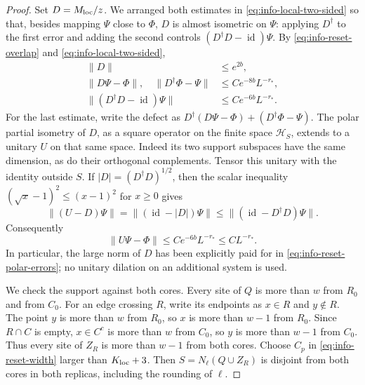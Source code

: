 \documentclass[11pt]{article}
\numberwithin{equation}{section}
\theoremstyle{definition}
\theoremstyle{remark}
\DeclareMathOperator{\id}{id}
\newcommand{\norm}[1]{\lVert #1\rVert}
\begin{document}
\begin{proof}
Set $D=M_{\rm loc}/z$.  We arranged both estimates in
\eqref{eq:info-local-two-sided} so that, besides mapping $\Psi$ close
to $\Phi$, $D$ is almost isometric on $\Psi$: applying $D^\dagger$
to the first error and adding the second controls
$(D^\dagger D-\id)\Psi$.  By
\eqref{eq:info-reset-overlap} and \eqref{eq:info-local-two-sided},
\begin{align}
 \norm D&\le e^{2b},\\
 \norm{D\Psi-\Phi},\quad\norm{D^\dagger\Phi-\Psi}
      &\le C e^{-8b}L^{-r_*},\\
 \norm{(D^\dagger D-\id)\Psi}
      &\le C e^{-6b}L^{-r_*}.
 \label{eq:info-reset-polar-errors}
\end{align}
For the last estimate, write the defect as
$D^\dagger(D\Psi-\Phi)+(D^\dagger\Phi-\Psi)$.
The polar partial isometry of $D$, as a square operator on the finite
space $\mathcal H_S$, extends to a unitary $U$ on that same space.
Indeed its two support subspaces have the same dimension, as do their
orthogonal complements.  Tensor this unitary with the identity outside
$S$.  If $|D|=(D^\dagger D)^{1/2}$, then the scalar inequality
$(\sqrt{x}-1)^2\le(x-1)^2$ for $x\ge0$ gives
\[
 \norm{(U-D)\Psi}=\norm{(\id-|D|)\Psi}
       \le\norm{(\id-D^\dagger D)\Psi}.
\]
Consequently
\begin{equation}
 \norm{U\Psi-\Phi}\le C e^{-6b}L^{-r_*}\le CL^{-r_*}.
 \label{eq:info-reset-unitary}
\end{equation}
In particular, the large norm of $D$ has been explicitly paid for in
\eqref{eq:info-reset-polar-errors}; no unitary dilation on an additional
system is used.

We check the support against both cores.  Every site of $Q$ is more
than $w$ from $R_0$ and from $C_0$.  For an edge crossing $R$, write its
endpoints as $x\in R$ and $y\notin R$.  The point $y$ is more than $w$
from $R_0$, so $x$ is more than $w-1$ from $R_0$.  Since $R\cap C$ is
empty, $x\in C^c$ is more than $w$ from $C_0$, so $y$ is more than
$w-1$ from $C_0$.  Thus every site of $Z_R$ is more than $w-1$ from
both cores.  Choose $C_p$ in \eqref{eq:info-reset-width} larger than
$K_{\rm loc}+3$.  Then $S=N_\ell(Q\cup Z_R)$ is disjoint from both cores in
both replicas, including the rounding of $\ell$.


\end{proof}
\end{document}

